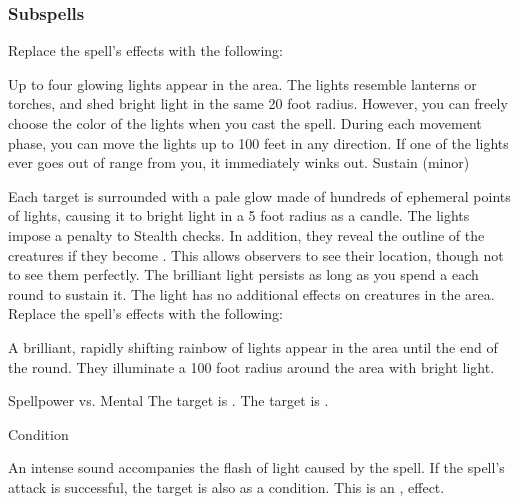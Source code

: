 \subsubsection{Subspells}
Replace the spell's effects with the following:
\begin{spellcontent}
\begin{augmenteffects}
\spelleffect
Up to four glowing lights appear in the area.
The lights resemble lanterns or torches, and shed bright light in the same 20 foot radius.
However, you can freely choose the color of the lights when you cast the spell.
During each movement phase, you can move the lights up to 100 feet in any direction.
If one of the lights ever goes out of range from you, it immediately winks out.
\spelldur Sustain (minor)
\end{augmenteffects}
\end{spellcontent}
Each target is surrounded with a pale glow made of hundreds of ephemeral points of lights, causing it to bright light in a 5 foot radius as a candle.
The lights impose a  penalty to Stealth checks.
In addition, they reveal the outline of the creatures if they become .
This allows observers to see their location, though not to see them perfectly.
The brilliant light persists as long as you spend a  each round to sustain it.
The light has no additional effects on creatures in the area.
Replace the spell's effects with the following:
\begin{spellcontent}
\begin{augmenteffects}
\spelleffect
A brilliant, rapidly shifting rainbow of lights appear in the area until the end of the round.
They illuminate a 100 foot radius around the area with bright light.
\begin{spellattack}{Spellpower vs. Mental}
\spellsuccess
The target is \disoriented.
\spellcritical
The target is \confused.
\end{spellattack}
\spelldur Condition
\end{augmenteffects}
\end{spellcontent}
An intense sound accompanies the flash of light caused by the spell.
If the spell's attack is successful, the target is also \deafened as a condition.
This is an ,  effect.
